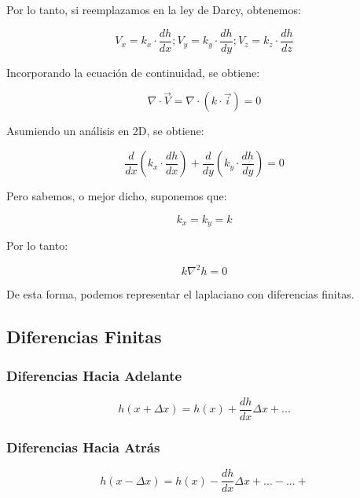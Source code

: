 Por lo tanto, si reemplazamos en la ley de Darcy, obtenemos:

\begin{equation}
    V_x = k_x\cdot \frac{dh}{dx}; V_y = k_y\cdot \frac{dh}{dy}; V_z = k_z\cdot \frac{dh}{dz}
\end{equation}

Incorporando la ecuación de continuidad, se obtiene:

\begin{equation}
    \nabla \cdot \vec{V} = \nabla \cdot (k \cdot \vec{i}) = 0
\end{equation}

Asumiendo un análisis en 2D, se obtiene:

\begin{equation}
    \frac{d}{dx}(k_x \cdot \frac{dh}{dx}) + \frac{d}{dy}(k_y \cdot \frac{dh}{dy}) = 0
\end{equation}

Pero sabemos, o mejor dicho, suponemos que:

\begin{equation}
    k_x = k_y = k
\end{equation}

Por lo tanto:

\begin{equation}
    k \nabla^2 h = 0
\end{equation}

De esta forma, podemos representar el laplaciano con diferencias finitas.

\subsection{Diferencias Finitas}

\subsubsection{Diferencias Hacia Adelante}

\begin{equation}
    h(x + \Delta x) = h(x) + \frac{dh}{dx} \Delta x + ...
\end{equation}

\subsubsection{Diferencias Hacia Atrás}

\begin{equation}
    h(x - \Delta x) = h(x) - \frac{dh}{dx} \Delta x + ...-...+
\end{equation}

